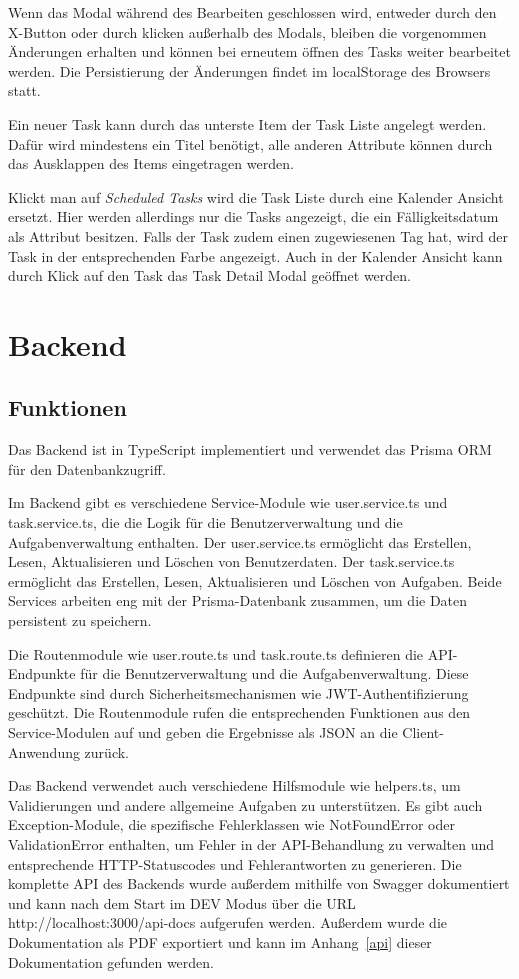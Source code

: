 \documentclass[a4paper, 12pt]{article}
\begin{document}
    Wenn das Modal während des Bearbeiten geschlossen wird, entweder durch den X-Button oder durch klicken außerhalb des
    Modals, bleiben die vorgenommen Änderungen erhalten und können bei erneutem öffnen des Tasks weiter bearbeitet
    werden. Die Persistierung der Änderungen findet im localStorage des Browsers statt.

    Ein neuer Task kann durch das unterste Item der Task Liste angelegt werden. Dafür wird mindestens ein Titel
    benötigt, alle anderen Attribute können durch das Ausklappen des Items eingetragen werden.

    Klickt man auf {\it Scheduled Tasks} wird die Task Liste durch eine Kalender Ansicht ersetzt. Hier werden allerdings
    nur die Tasks angezeigt, die ein Fälligkeitsdatum als Attribut besitzen. Falls der Task zudem einen zugewiesenen Tag
    hat, wird der Task in der entsprechenden Farbe angezeigt. Auch in der Kalender Ansicht kann durch Klick auf den Task
    das Task Detail Modal geöffnet werden.


    \section{Backend}
    \subsection{Funktionen}

    Das Backend ist in TypeScript implementiert und verwendet das Prisma ORM für den Datenbankzugriff.

    Im Backend gibt es verschiedene Service-Module wie user.service.ts und task.service.ts, die die Logik für die
    Benutzerverwaltung und die Aufgabenverwaltung enthalten. Der user.service.ts ermöglicht das Erstellen, Lesen,
    Aktualisieren und Löschen von Benutzerdaten. Der task.service.ts ermöglicht das Erstellen, Lesen, Aktualisieren und
    Löschen von Aufgaben. Beide Services arbeiten eng mit der Prisma-Datenbank zusammen, um die Daten persistent zu
    speichern.

    Die Routenmodule wie user.route.ts und task.route.ts definieren die API-Endpunkte für die Benutzerverwaltung und die
    Aufgabenverwaltung. Diese Endpunkte sind durch Sicherheitsmechanismen wie JWT-Authentifizierung geschützt. Die
    Routenmodule rufen die entsprechenden Funktionen aus den Service-Modulen auf und geben die Ergebnisse als JSON an die
    Client-Anwendung zurück.

    Das Backend verwendet auch verschiedene Hilfsmodule wie helpers.ts, um Validierungen und andere allgemeine Aufgaben zu
    unterstützen. Es gibt auch Exception-Module, die spezifische Fehlerklassen wie NotFoundError oder ValidationError
    enthalten, um Fehler in der API-Behandlung zu verwalten und entsprechende HTTP-Statuscodes und Fehlerantworten zu
    generieren. Die komplette API des Backends wurde außerdem mithilfe von Swagger dokumentiert und kann nach dem Start
    im DEV Modus über die URL http://localhost:3000/api-docs aufgerufen werden. Außerdem wurde die Dokumentation als
    PDF exportiert und kann im Anhang~\ref{api} dieser Dokumentation gefunden werden.
\end{document}
